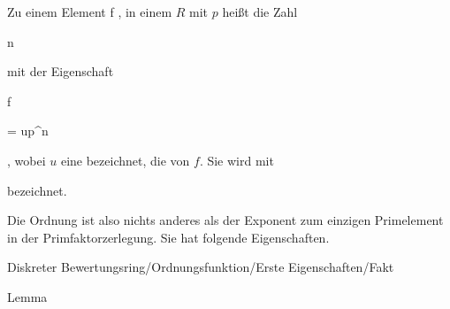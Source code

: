 {


Zu einem Element  { f    }{,} in einem
$R$ mit
$p$ heißt die Zahl


\mavergleichskette

{\vergleichskette

{ n
}

{ \in }{ \N
}

{  }{
}

{    }{
}

{   }{
}

}
{}{}{}
mit der Eigenschaft


\mavergleichskette

{\vergleichskette

{f
}

{ = }{ up^n
}

{  }{
}

{    }{
}

{   }{
}

}
{}{}{,}
wobei $u$ eine
bezeichnet, die  von $f$. Sie wird mit

 bezeichnet.


}


Die Ordnung ist also nichts anderes als der Exponent zum
 {} {}
einzigen Primelement in der Primfaktorzerlegung. Sie hat folgende Eigenschaften.



{Diskreter Bewertungsring/Ordnungsfunktion/Erste Eigenschaften/Fakt}

{Lemma}

{}

